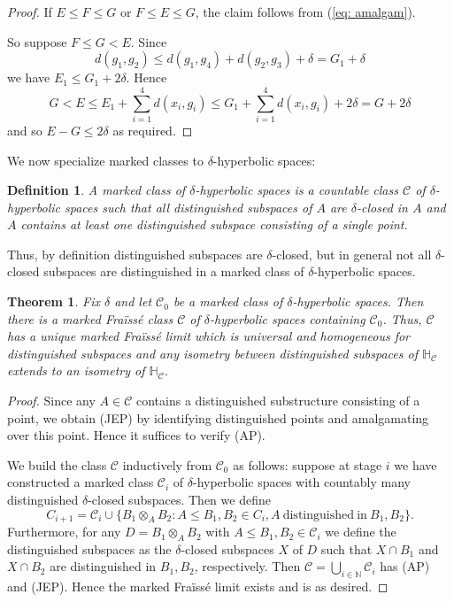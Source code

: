 \documentclass{amsart}
\renewcommand{\d}{\delta}
\renewcommand{\H}{\mathbb{H}}
\newcommand{\C}{\mathcal{C}}
\newtheorem{theorem}[defi]{Theorem}
\newtheorem{definition}[defi]{Definition}
\begin{document}
\begin{proof}
If $E\leq F\leq G$ or $F\leq E\leq G$,  the claim follows from (\ref{eq: amalgam}).

\medskip
So suppose $F\leq G<E$. Since
\[d(g_1,g_2)\leq d(g_1,g_4)+d(g_2,g_3)+\d=G_1+\d\]
we have $E_1\leq G_1+2\d$. Hence 
\[G<E\leq E_1+ \sum_{i=1}^4 d(x_i,g_i) \leq G_1+ \sum_{i=1}^4 d(x_i,g_i)+2\d= G+2\d\] and so $E-G\leq 2\d$ as required.



\end{proof}

We now specialize marked classes to $\d$-hyperbolic spaces:
\begin{definition}\label{def:marked delta class}
A \emph{marked class} of $\d$-hyperbolic spaces is 
a countable class $\C$ of $\d$-hyperbolic spaces such that all distinguished subspaces of $A$ are $\d$-closed in $A$ and $A$ contains at least one distinguished subspace consisting of a single point.
\end{definition}

Thus, by definition distinguished subspaces are $\d$-closed, but in general not all $\d$-closed subspaces are distinguished in a marked class of $\d$-hyperbolic spaces.

\begin{theorem}\label{thm:amalgamation works}
Fix $\d$ and let $\C_0$  be a marked class of $\d$-hyperbolic spaces.
Then there is a marked Fra\"iss\'e class $\C$ of  $\d$-hyperbolic spaces containing $\C_0$. Thus, $\C$ has a unique marked Fra\"iss\'e limit which is universal and homogeneous for
 distinguished  subspaces and any isometry between distinguished subspaces of $\H_\C$ extends to an isometry of $\H_\C$.
\end{theorem}

\begin{proof}
Since any $A\in\C$ contains a distinguished substructure consisting of a point, we obtain (JEP) by identifying distinguished points and amalgamating over this point. Hence it suffices to verify (AP).

We build the class $\C$ inductively from $\C_0$ as follows: suppose at stage $i$ we have constructed a marked class $\C_i$  of $\d$-hyperbolic spaces with countably many distinguished $\d$-closed subspaces. Then we define 
\[C_{i+1}=\C_i\cup \{B_1\otimes_A B_2\colon A\leq B_1, B_2\in C_i, A \mathrm{\ distinguished\ in\ } B_1, B_2\}. \] 
Furthermore, for any $D=B_1\otimes_A B_2$ with $A\leq B_1,B_2\in\C_i$  we define the distinguished subspaces as the  $\d$-closed subspaces $X$ of $D$ such that $X\cap B_1$ and $X\cap B_2$ are  distinguished in $B_1, B_2$, respectively.
Then $\C=\bigcup_{i\in\mathbb{N}}\C_i$ has (AP) and (JEP). 
Hence the marked Fra\"iss\'e limit exists and is as desired.
\end{proof}
\end{document}

